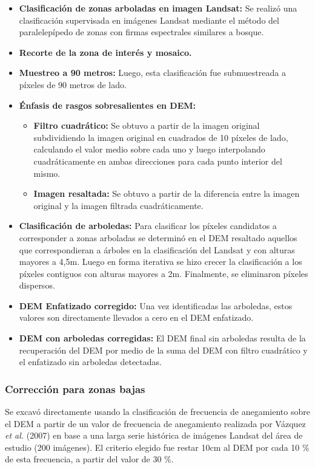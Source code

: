\documentclass[10pt,a4paper, twoside]{report}
\begin{document}
\begin{itemize}
	\item \textbf{Clasificación de zonas arboladas en imagen Landsat:} Se realizó una clasificación supervisada en imágenes Landsat mediante el método del paralelepípedo de zonas con firmas espectrales similares a bosque.
	\item \textbf{Recorte de la zona de interés y mosaico.}
	\item \textbf{Muestreo a 90 metros:} Luego, esta clasificación fue submuestreada a píxeles de 90 metros de lado. 
	\item \textbf{Énfasis de rasgos sobresalientes en DEM:}	
	\begin{itemize}
		\item \textbf{Filtro cuadrático:} Se obtuvo a partir de la imagen original subdividiendo la imagen original en cuadrados de 10 píxeles de lado, calculando el valor medio sobre cada uno y luego interpolando cuadráticamente en ambas direcciones para cada punto interior del mismo. 
		\item \textbf{Imagen resaltada:} Se obtuvo a partir de la diferencia entre la imagen original y la imagen filtrada cuadráticamente.
	\end{itemize}
	\item \textbf{Clasificación de arboledas:} Para clasificar los píxeles candidatos a corresponder a zonas arboladas se determinó en el DEM resaltado aquellos que correspondieran a árboles en la clasificación del Landsat y con alturas mayores a 4,5m. Luego en forma iterativa se hizo crecer la clasificación a los píxeles contiguos con alturas mayores a 2m. Finalmente, se eliminaron píxeles dispersos.
	\item \textbf{DEM Enfatizado corregido:} Una vez identificadas las arboledas, estos valores son directamente llevados a cero en el DEM enfatizado.	
	\item \textbf{DEM con arboledas corregidas:} El DEM final sin arboledas resulta de la recuperación del DEM por medio de la suma del DEM con filtro cuadrático y el enfatizado sin arboledas detectadas.	
\end{itemize}

\subsubsection{Corrección para zonas bajas}

Se excavó directamente usando la clasificación de frecuencia de anegamiento sobre el DEM a partir de un valor de frecuencia de anegamiento realizada por Vázquez \textit{et al.} (2007) en base a una larga serie histórica de imágenes Landsat del área de estudio (200 imágenes). El criterio elegido fue restar 10cm al DEM por cada 10 \% de esta frecuencia, a partir del valor de 30 \%.
\end{document}
